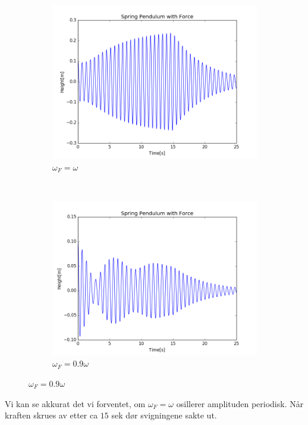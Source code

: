 \documentclass[a4paper,norsk, 10pt]{article}
\begin{document}
\begin{figure}[H]
\centering
\begin{subfigure}[b]{0.4\textwidth}
\includegraphics[width=\textwidth]{1omega.png}
\caption{$\omega_F = \omega$}
\end{subfigure}
~
\begin{subfigure}[b]{0.4\textwidth}
\includegraphics[width=\textwidth]{09omega.png}
\caption{$\omega_F = 0.9\omega$}
\end{subfigure}
\end{figure}

Vi kan se akkurat det vi forventet, om $\omega_F = \omega$ osillerer amplituden periodisk. Når kraften skrues av etter ca $15$ sek dør svigningene sakte ut.
\end{document}
